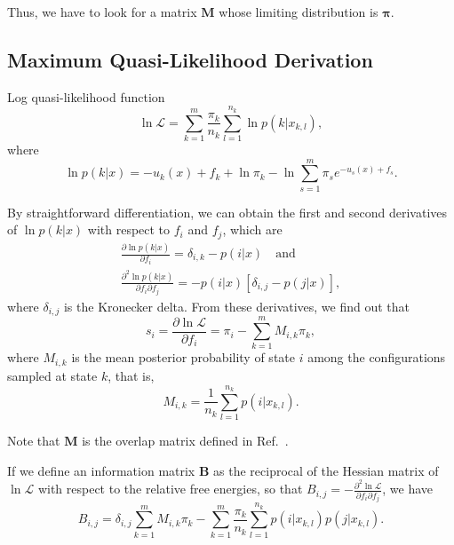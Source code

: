 \documentclass[aip,jcp,reprint,amsmath,amssymb]{revtex4-1}
\newcommand{\mt}[1]{\boldsymbol{\mathbf{#1}}}           %
\newcommand{\vt}[1]{\boldsymbol{\mathbf{#1}}}           %
\begin{document}
Thus, we have to look for a matrix $\mt M$ whose limiting distribution is $\vt \pi$.

\subsection{Maximum Quasi-Likelihood Derivation}

Log quasi-likelihood function\cite{Geyer_1992, Geyer_1994}
\begin{equation}
\label{eq:gmbar log quasi-likelihood}
\ln \mathcal L = \sum_{k=1}^m \frac{\pi_k}{n_k} \sum_{l=1}^{n_k} \ln p(k|x_{k,l}),
\end{equation}
where
\begin{equation*}
\ln p(k|x) = -u_k(x) + f_k + \ln \pi_k - \ln \sum_{s=1}^m \pi_s e^{-u_s(x) + f_s}.
\end{equation*}

By straightforward differentiation, we can obtain the first and second derivatives of $\ln p(k|x)$ with respect to $f_i$ and $f_j$, which are
\begin{gather*}
\frac{\partial \ln p(k|x)}{\partial f_i} = \delta_{i,k} - p(i|x) \quad \text{and} \\
\frac{\partial^2\ln p(k|x)}{\partial f_i \partial f_j} = -p(i|x)[\delta_{i,j} - p(j|x)],
\end{gather*}
where $\delta_{i,j}$ is the Kronecker delta. From these derivatives, we find out that
\begin{equation*}
s_i = \frac{\partial \ln \mathcal L}{\partial f_i} = \pi_i - \sum_{k=1}^m M_{i,k} \pi_k,
\end{equation*}
where $M_{i,k}$ is the mean posterior probability of state $i$ among the configurations sampled at state $k$, that is,
\begin{equation*}
M_{i,k} = \frac{1}{n_k} \sum_{l=1}^{n_k} p(i|x_{k,l}).
\end{equation*}

Note that $\mt M$ is the overlap matrix defined in Ref.~.

If we define an information matrix $\mt B$ as the reciprocal of the Hessian matrix of $\ln \mathcal L$ with respect to the relative free energies, so that $B_{i,j} = -\frac{\partial^2 \ln \mathcal L}{\partial f_i \partial f_j}$, we have
\begin{equation*}
B_{i,j} = \delta_{i,j} \sum_{k=1}^m M_{i,k} \pi_k - \sum_{k=1}^m \frac{\pi_k}{n_k} \sum_{l=1}^{n_k} p(i|x_{k,l})p(j|x_{k,l}).
\end{equation*}
\end{document}
